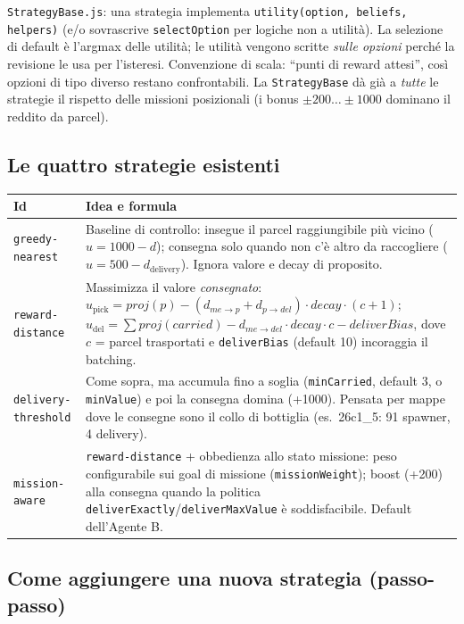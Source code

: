 \documentclass[11pt,a4paper]{article}
\newcommand{\file}[1]{\texttt{#1}}
\newcommand{\code}[1]{\texttt{#1}}
\begin{document}
\file{StrategyBase.js}: una strategia implementa
\code{utility(option, beliefs, helpers)} (e/o sovrascrive
\code{selectOption} per logiche non a utilità). La selezione di default è
l'argmax delle utilità; le utilità vengono scritte \emph{sulle opzioni}
perché la revisione le usa per l'isteresi. Convenzione di scala: ``punti di
reward attesi'', così opzioni di tipo diverso restano confrontabili. La
\code{StrategyBase} dà già a \emph{tutte} le strategie il rispetto delle
missioni posizionali (i bonus $\pm200\ldots\pm1000$ dominano il reddito da
parcel).

\subsection{Le quattro strategie esistenti}

\begin{longtable}{@{}p{}p{}@{}}
\toprule
\textbf{Id} & \textbf{Idea e formula} \\
\midrule
\code{greedy-nearest} & Baseline di controllo: insegue il parcel
  raggiungibile più vicino ($u = 1000 - d$); consegna solo quando non c'è
  altro da raccogliere ($u = 500 - d_{\text{delivery}}$). Ignora valore e
  decay di proposito. \\
\midrule
\code{reward-distance} & Massimizza il valore \emph{consegnato}:
  $u_{\text{pick}} = \mathit{proj}(p) - (d_{me\to p} + d_{p\to del})\cdot
  \mathit{decay} \cdot (c+1)$;
  $u_{\text{del}} = \sum \mathit{proj}(carried) - d_{me\to del}\cdot
  \mathit{decay}\cdot c - \mathit{deliverBias}$, dove $c$ = parcel
  trasportati e \code{deliverBias} (default 10) incoraggia il batching. \\
\midrule
\code{delivery-threshold} & Come sopra, ma accumula fino a soglia
  (\code{minCarried}, default 3, o \code{minValue}) e poi la consegna
  domina (+1000). Pensata per mappe dove le consegne sono il collo di
  bottiglia (es.\ 26c1\_5: 91 spawner, 4 delivery). \\
\midrule
\code{mission-aware} & \code{reward-distance} + obbedienza allo stato
  missione: peso configurabile sui goal di missione
  (\code{missionWeight}); boost (+200) alla consegna quando la politica
  \code{deliverExactly}/\code{deliverMaxValue} è soddisfacibile. Default
  dell'Agente B. \\
\bottomrule
\end{longtable}

\subsection{Come aggiungere una nuova strategia (passo-passo)}
\end{document}
